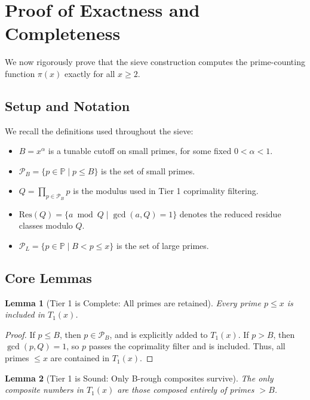 \documentclass[11pt]{article}
\newtheorem{lemma}{Lemma}
\begin{document}
	
	\section{Proof of Exactness and Completeness}
	
	We now rigorously prove that the sieve construction computes the prime-counting function \( \pi(x) \) exactly for all \( x \geq 2 \).
	
	\subsection{Setup and Notation}
	
	We recall the definitions used throughout the sieve:
	
	\begin{itemize}
		\item \( B = x^\alpha \) is a tunable cutoff on small primes, for some fixed \( 0 < \alpha < 1 \).
		\item \( \mathcal{P}_B = \{p \in \mathbb{P} \mid p \leq B\} \) is the set of small primes.
		\item \( Q = \prod_{p \in \mathcal{P}_B} p \) is the modulus used in Tier 1 coprimality filtering.
		\item \( \text{Res}(Q) = \{a \bmod Q \mid \gcd(a, Q) = 1\} \) denotes the reduced residue classes modulo \( Q \).
		\item \( \mathcal{P}_L = \{p \in \mathbb{P} \mid B < p \leq x\} \) is the set of large primes.
	\end{itemize}
	
	\subsection{Core Lemmas}
	
	\begin{lemma}[Tier 1 is Complete: All primes are retained]
		Every prime \( p \leq x \) is included in \( T_1(x) \).
	\end{lemma}
	
	\begin{proof}
		If \( p \leq B \), then \( p \in \mathcal{P}_B \), and is explicitly added to \( T_1(x) \).  
		If \( p > B \), then \( \gcd(p, Q) = 1 \), so \( p \) passes the coprimality filter and is included.  
		Thus, all primes \( \leq x \) are contained in \( T_1(x) \).
	\end{proof}
	
	\begin{lemma}[Tier 1 is Sound: Only B-rough composites survive]
		The only composite numbers in \( T_1(x) \) are those composed entirely of primes \( > B \).
	\end{lemma}
	
\end{document}
